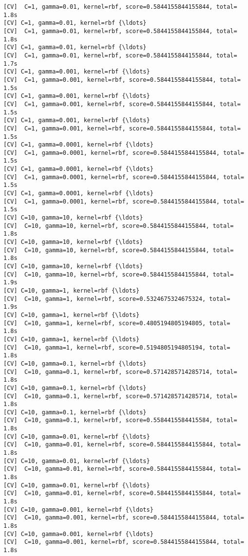 \documentclass[11pt]{article}
\begin{document}
\begin{Verbatim}[commandchars=\\\{\}]
[CV]  C=1, gamma=0.01, kernel=rbf, score=0.5844155844155844, total=   1.8s
[CV] C=1, gamma=0.01, kernel=rbf {\ldots}
[CV]  C=1, gamma=0.01, kernel=rbf, score=0.5844155844155844, total=   1.8s
[CV] C=1, gamma=0.01, kernel=rbf {\ldots}
[CV]  C=1, gamma=0.01, kernel=rbf, score=0.5844155844155844, total=   1.7s
[CV] C=1, gamma=0.001, kernel=rbf {\ldots}
[CV]  C=1, gamma=0.001, kernel=rbf, score=0.5844155844155844, total=   1.5s
[CV] C=1, gamma=0.001, kernel=rbf {\ldots}
[CV]  C=1, gamma=0.001, kernel=rbf, score=0.5844155844155844, total=   1.5s
[CV] C=1, gamma=0.001, kernel=rbf {\ldots}
[CV]  C=1, gamma=0.001, kernel=rbf, score=0.5844155844155844, total=   1.5s
[CV] C=1, gamma=0.0001, kernel=rbf {\ldots}
[CV]  C=1, gamma=0.0001, kernel=rbf, score=0.5844155844155844, total=   1.5s
[CV] C=1, gamma=0.0001, kernel=rbf {\ldots}
[CV]  C=1, gamma=0.0001, kernel=rbf, score=0.5844155844155844, total=   1.5s
[CV] C=1, gamma=0.0001, kernel=rbf {\ldots}
[CV]  C=1, gamma=0.0001, kernel=rbf, score=0.5844155844155844, total=   1.5s
[CV] C=10, gamma=10, kernel=rbf {\ldots}
[CV]  C=10, gamma=10, kernel=rbf, score=0.5844155844155844, total=   1.8s
[CV] C=10, gamma=10, kernel=rbf {\ldots}
[CV]  C=10, gamma=10, kernel=rbf, score=0.5844155844155844, total=   1.8s
[CV] C=10, gamma=10, kernel=rbf {\ldots}
[CV]  C=10, gamma=10, kernel=rbf, score=0.5844155844155844, total=   1.9s
[CV] C=10, gamma=1, kernel=rbf {\ldots}
[CV]  C=10, gamma=1, kernel=rbf, score=0.5324675324675324, total=   1.9s
[CV] C=10, gamma=1, kernel=rbf {\ldots}
[CV]  C=10, gamma=1, kernel=rbf, score=0.4805194805194805, total=   1.8s
[CV] C=10, gamma=1, kernel=rbf {\ldots}
[CV]  C=10, gamma=1, kernel=rbf, score=0.5194805194805194, total=   1.8s
[CV] C=10, gamma=0.1, kernel=rbf {\ldots}
[CV]  C=10, gamma=0.1, kernel=rbf, score=0.5714285714285714, total=   1.8s
[CV] C=10, gamma=0.1, kernel=rbf {\ldots}
[CV]  C=10, gamma=0.1, kernel=rbf, score=0.5714285714285714, total=   1.8s
[CV] C=10, gamma=0.1, kernel=rbf {\ldots}
[CV]  C=10, gamma=0.1, kernel=rbf, score=0.5584415584415584, total=   1.8s
[CV] C=10, gamma=0.01, kernel=rbf {\ldots}
[CV]  C=10, gamma=0.01, kernel=rbf, score=0.5844155844155844, total=   1.8s
[CV] C=10, gamma=0.01, kernel=rbf {\ldots}
[CV]  C=10, gamma=0.01, kernel=rbf, score=0.5844155844155844, total=   1.8s
[CV] C=10, gamma=0.01, kernel=rbf {\ldots}
[CV]  C=10, gamma=0.01, kernel=rbf, score=0.5844155844155844, total=   1.8s
[CV] C=10, gamma=0.001, kernel=rbf {\ldots}
[CV]  C=10, gamma=0.001, kernel=rbf, score=0.5844155844155844, total=   1.8s
[CV] C=10, gamma=0.001, kernel=rbf {\ldots}
[CV]  C=10, gamma=0.001, kernel=rbf, score=0.5844155844155844, total=   1.8s

\end{Verbatim}
\end{document}

